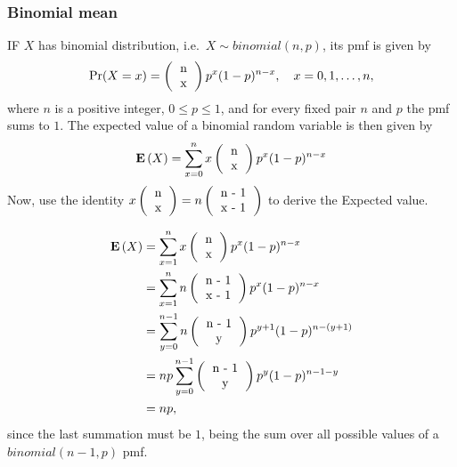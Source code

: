 \subsubsection*{Binomial mean}
IF $X$ has binomial distribution, i.e.~$X \sim binomial(n, p)$, its pmf is given by
$$
\Pr(X=x) = \left( \begin{tabular}{c} n\\x\\ \end{tabular} \right) p^x (1 - p)^{n - x}, \quad x=0, 1, \dots, n,
$$
%
where $n$ is a positive integer, $0 \le p \le 1$, and for every fixed pair $n$ and $p$ the pmf sums to $1$.
The expected value of a binomial random variable is then given by
$$
\Expected{X} = \sum\limits_{x=0}^{n} x \left( \begin{tabular}{c} n\\x\\ \end{tabular} \right) p^x (1 - p)^{n - x}
$$
Now, use the identity $x\left( \begin{tabular}{c} n\\x\\ \end{tabular} \right) = n \left( \begin{tabular}{c} n - 1\\ x - 1\\ \end{tabular} \right)$ to derive the Expected value.
%
\begin{pf}
$$
\begin{aligned}
\Expected{X} 
&= \sum\limits_{x=1}^{n} x \left( \begin{tabular}{c} n\\x\\ \end{tabular} \right) p^x (1 - p)^{n - x}\\
&= \sum\limits_{x=1}^{n} n \left( \begin{tabular}{c} n - 1\\ x - 1\\ \end{tabular} \right) p^x (1 - p)^{n - x}\\
&= \sum\limits_{y=0}^{n - 1} n \left( \begin{tabular}{c} n - 1\\ y\\ \end{tabular} \right) p^{y + 1} (1 - p)^{n - (y + 1)}\\
&=np \sum\limits_{y=0}^{n - 1} \left( \begin{tabular}{c} n - 1\\ y\\ \end{tabular} \right) p^{y} (1 - p)^{n - 1 - y}\\
&= np,
\end{aligned}
$$
since the last summation must be $1$, being the sum over all possible values of a $binomial(n - 1, p)$ pmf.
\end{pf}
%
